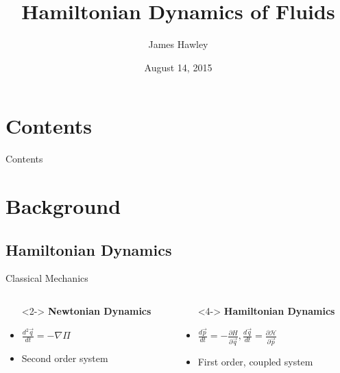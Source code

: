\documentclass{beamer}
\title{Hamiltonian Dynamics of Fluids}
\author{James Hawley}
\date{August 14, 2015}
\institute{University of Waterloo}
\begin{document}
	\begin{frame}
		\titlepage
	\end{frame}

	\section*{Contents}
		\begin{frame}{Contents}
			\tableofcontents
		\end{frame}

	\section{Background}
		\subsection{Hamiltonian Dynamics}
			\begin{frame}[t]{Classical Mechanics}
				\begin{columns}
					\begin{column}{0.5\textwidth}
						\begin{itemize}
							\item[]<2-> \textbf{Newtonian Dynamics}
							\item<3-> $\frac{d^2 \vec q}{dt} = -\nabla \Pi$
							\item<3-> Second order system
						\end{itemize}
					\end{column}
					\begin{column}{0.5\textwidth}
						\begin{itemize}
							\item[]<4-> \textbf{Hamiltonian Dynamics}
							\item<5-> $\frac{d \vec p}{dt} = -\frac{\partial H}{\partial \vec q}, \frac{d \vec q}{dt} = \frac{\partial \mathcal{H}}{\partial \vec p}$
							\item<5-> First order, coupled system
						\end{itemize}
					\end{column}
				\end{columns}
			\end{frame}
\end{document}
